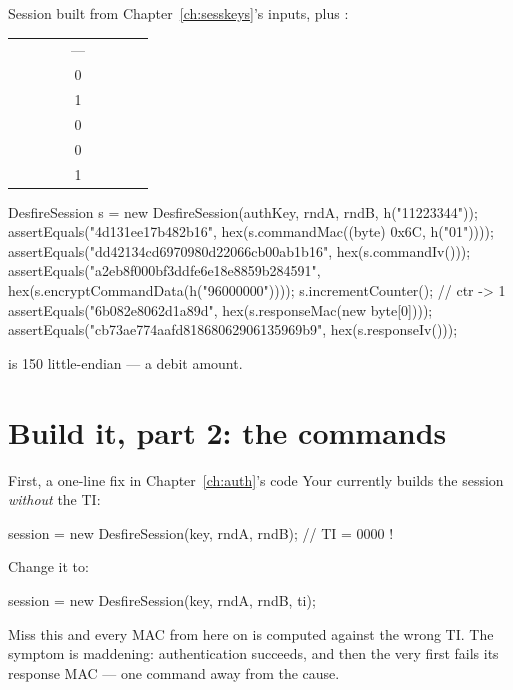 Session built from Chapter~\ref{ch:sesskeys}'s inputs, plus :

\begin{center}\small
\begin{tabular}{@{}L{0.40\linewidth}cL{0.40\linewidth}@{}}
\toprule
{} &  &  \\
\midrule
{} & --- &  \\
  & 0 &  \\
         & 1 &  \\
               & 0 &  \\
 & 0 &  \\
              & 1 &  \\
\bottomrule
\end{tabular}
\end{center}

\begin{jcode}
DesfireSession s = new DesfireSession(authKey, rndA, rndB, h("11223344"));
assertEquals("4d131ee17b482b16", hex(s.commandMac((byte) 0x6C, h("01"))));
assertEquals("dd42134cd6970980d22066cb00ab1b16", hex(s.commandIv()));
assertEquals("a2eb8f000bf3ddfe6e18e8859b284591",
             hex(s.encryptCommandData(h("96000000"))));
s.incrementCounter();                                   // ctr -> 1
assertEquals("6b082e8062d1a89d", hex(s.responseMac(new byte[0])));
assertEquals("cb73ae774aafd81868062906135969b9", hex(s.responseIv()));
\end{jcode}

 is 150 little-endian --- a  debit amount.

\section{Build it, part 2: the commands}

\begin{trap}{First, a one-line fix in Chapter~\ref{ch:auth}'s code}
Your  currently builds the session \emph{without} the
TI:

\begin{jcode}
session = new DesfireSession(key, rndA, rndB);        // TI = 0000 !
\end{jcode}

Change it to:

\begin{jcode}
session = new DesfireSession(key, rndA, rndB, ti);
\end{jcode}

Miss this and every MAC from here on is computed against the wrong TI. The
symptom is maddening: authentication succeeds, and then the very first
 fails its response MAC --- one command away from the cause.
\end{trap}

